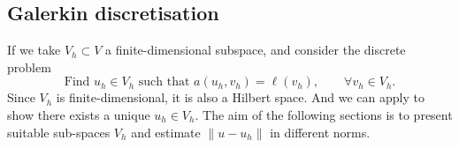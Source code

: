 \subsection{Galerkin discretisation}
If we take $V_h \subset V$ a finite-dimensional subspace, and consider the discrete problem
\begin{equation}
    \tag{E$_h$}
    \label{eq:Galerkin elliptic variational discrete}
    \text{Find }u_h \in V_h \text{ such that } a(u_h,v_h) = \ell (v_h) , \qquad \forall v_h \in V_h.
\end{equation}
Since $V_h$ is finite-dimensional, it is also a Hilbert space. And we can apply  to show there exists a unique $u_h \in V_h$. The aim of the following sections is to present suitable sub-spaces $V_h$ and estimate $\|u - u_h\|$ in different norms.

